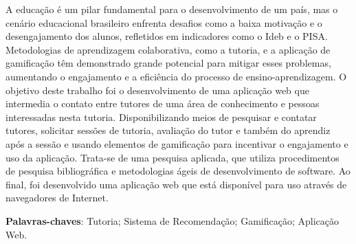 \begin{resumo}

A educação é um pilar fundamental para o desenvolvimento de um país, mas o cenário educacional brasileiro enfrenta desafios como a baixa motivação e o desengajamento dos alunos, refletidos em indicadores como o Ideb e o PISA. Metodologias de aprendizagem colaborativa, como a tutoria, e a aplicação de gamificação têm demonstrado grande potencial para mitigar esses problemas, aumentando o engajamento e a eficiência do processo de ensino-aprendizagem. O objetivo deste trabalho foi o desenvolvimento de uma aplicação web que intermedia o contato entre tutores de uma área de conhecimento e pessoas interessadas nesta tutoria. Disponibilizando meios de pesquisar e contatar tutores, solicitar sessões de tutoria, avaliação do tutor e também do aprendiz após a sessão e usando elementos de gamificação para incentivar o engajamento e uso da aplicação. Trata-se de uma pesquisa aplicada, que utiliza procedimentos de pesquisa bibliográfica e metodologias ágeis de desenvolvimento de software. Ao final, foi desenvolvido uma aplicação web que está disponível para uso através de navegadores de Internet.

 \vspace{\onelineskip}
    
 \noindent
 \textbf{Palavras-chaves}: Tutoria; Sistema de Recomendação; Gamificação; Aplicação Web.
\end{resumo}
